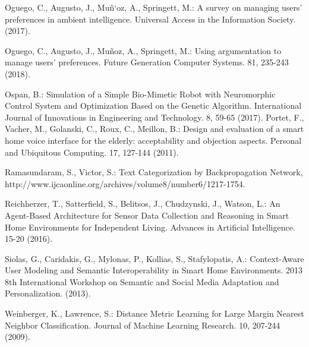 \documentclass{llncs}
\begin{document}
\begin{thebibliography}{1}
        Oguego, C., Augusto, J., Muñ`oz, A., Springett, M.: A survey on managing users’ preferences in ambient intelligence. Universal Access in the Information Society. (2017).

        Oguego, C., Augusto, J., Muñoz, A., Springett, M.: Using argumentation to manage users’ preferences. Future Generation Computer Systems. 81, 235-243 (2018).

        Ospan, B.: Simulation of a Simple Bio-Mimetic Robot with Neuromorphic Control System and Optimization Based on the Genetic Algorithm. International Journal of Innovations in Engineering and Technology. 8, 59-65 (2017).
        Portet, F., Vacher, M., Golanski, C., Roux, C., Meillon, B.: Design and evaluation of a smart home voice interface for the elderly: acceptability and objection aspects. Personal and Ubiquitous Computing. 17, 127-144 (2011).

        Ramasundaram, S., Victor, S.: Text Categorization by Backpropagation Network, http://www.ijcaonline.org/archives/volume8/number6/1217-1754.

        Reichherzer, T., Satterfield, S., Belitsos, J., Chudzynski, J., Watson, L.: An Agent-Based Architecture for Sensor Data Collection and Reasoning in Smart Home Environments for Independent Living. Advances in Artificial Intelligence. 15-20 (2016).

        Siolas, G., Caridakis, G., Mylonas, P., Kollias, S., Stafylopatis, A.: Context-Aware User Modeling and Semantic Interoperability in Smart Home Environments. 2013 8th International Workshop on Semantic and Social Media Adaptation and Personalization. (2013).

        Weinberger, K., Lawrence, S.: Distance Metric Learning for Large Margin Nearest Neighbor Classification. Journal of Machine Learning Research. 10, 207-244 (2009).

    \end{thebibliography}
\end{document}

